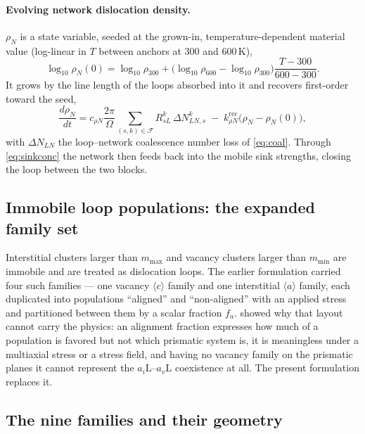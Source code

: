 \documentclass{article}
\newcommand{\aloop}{\ensuremath{\langle a\rangle}}
\newcommand{\cloop}{\ensuremath{\langle c\rangle}}
\newcommand{\aiL}{a_{i}\mathrm{L}}
\newcommand{\avL}{a_{v}\mathrm{L}}
\begin{document}
\paragraph{Evolving network dislocation density.} $\rho_N$ is a state variable,
seeded at the grown-in, temperature-dependent material value (log-linear in $T$
between anchors at $300$ and $600\,$K),
\begin{equation}
\log_{10}\rho_N(0)=\log_{10}\rho_{300}
 +\bigl(\log_{10}\rho_{600}-\log_{10}\rho_{300}\bigr)\frac{T-300}{600-300}.
\label{eq:rhoNseed}
\end{equation}
It grows by the line length of the loops absorbed into it and recovers
first-order toward the seed,
\begin{equation}
\frac{d\rho_N}{dt}=c_{\rho N}\frac{2\pi}{\Omega}
   \sum_{(s,k)\in\mathcal F} R^k_{sL}\,\Delta N^{k}_{LN,s}
 \;-\;k_{\rho N}^{\mathrm{rec}}\bigl(\rho_N-\rho_N(0)\bigr),
\label{eq:rhoN}
\end{equation}
with $\Delta N_{LN}$ the loop--network coalescence number loss of
\cref{eq:coal}. Through \cref{eq:sinkconc} the network then feeds back into the
mobile sink strengths, closing the loop between the two blocks.
\subsection{Immobile loop populations: the expanded family set}
\label{sec:immobileClusters}

Interstitial clusters larger than $m_{\max}$ and vacancy clusters larger than
$m_{\min}$ are immobile and are treated as dislocation loops. The earlier
formulation carried four such families --- one vacancy \cloop{} family and one
interstitial \aloop{} family, each duplicated into populations ``aligned'' and
``non-aligned'' with an applied stress and partitioned between them by a scalar
fraction $f_a$.  showed why that layout cannot carry the
physics: an alignment fraction expresses how much of a population is favored but
not which prismatic system is, it is meaningless under a multiaxial stress or a
stress field, and having no vacancy family on the prismatic planes it cannot
represent the $\aiL$--$\avL$ coexistence at all. The present formulation
replaces it.

\subsection{The nine families and their geometry}
\label{sec:families}
\end{document}
